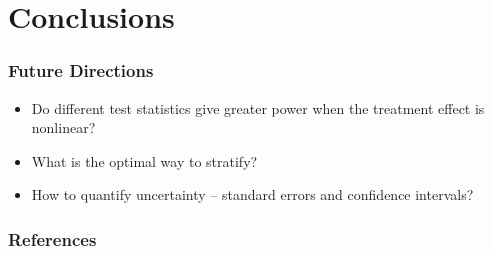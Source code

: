 \documentclass{beamer}
\begin{document}
\section[Conclusions]{Conclusions}
\frame
{
  \frametitle{Future Directions}
\begin{center}
\begin{itemize}
\item Do different test statistics give greater power when the treatment effect is nonlinear?
\item What is the optimal way to stratify?
\item How to quantify uncertainty -- standard errors and confidence intervals?
\end{itemize}
\end{center}
}




\begin{frame}
\frametitle{References}
\tiny


\itemize
\end{frame}
\end{document}
